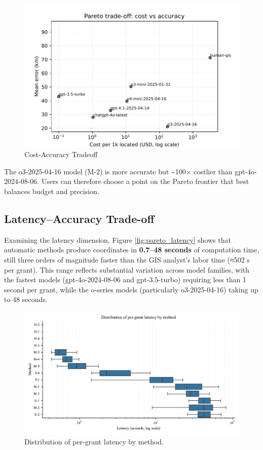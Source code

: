 \begin{figure}
\centering
\includegraphics[width=\textwidth,height=0.8\textheight,keepaspectratio]{figures/pareto_tradeoff.pdf}
\caption{Cost-Accuracy Tradeoff}\label{fig:pareto_cost}
\end{figure}

The o3-2025-04-16 model (M-2) is more accurate but \textasciitilde100×
costlier than gpt-4o-2024-08-06. Users can therefore choose a point on
the Pareto frontier that best balances budget and precision.

\subsection{Latency--Accuracy
Trade-off}\label{latencyaccuracy-trade-off}

Examining the latency dimension, Figure \ref{fig:pareto_latency} shows
that automatic methods produce coordinates in \textbf{0.7--48 seconds}
of computation time, still three orders of magnitude faster than the GIS
analyst's labor time (≈502 s per grant). This range reflects substantial
variation across model families, with the fastest models
(gpt-4o-2024-08-06 and gpt-3.5-turbo) requiring less than 1 second per
grant, while the o-series models (particularly o3-2025-04-16) taking up
to 48 seconds.

\begin{figure}[H]
\centering
\includegraphics[width=0.75\linewidth]{figures/latency_boxplot.pdf}
\caption{Distribution of per-grant latency by method.}
\label{fig:latency_box}
\end{figure}


